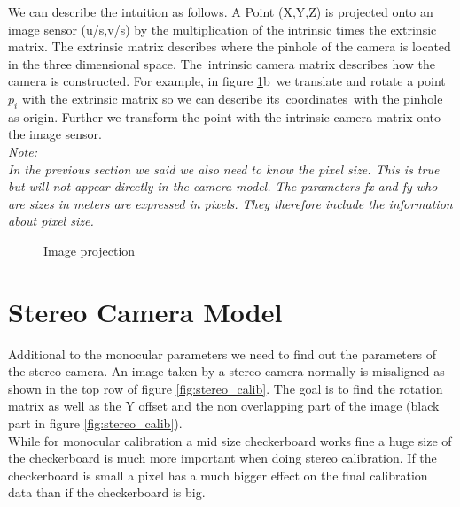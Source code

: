 \documentclass[11pt,a4paper,titlepage,oneside]{report}
\begin{document}
We can describe the intuition as follows. A Point (X,Y,Z) is projected onto an image sensor (u/s,v/s) by the multiplication of the intrinsic times the extrinsic matrix. The extrinsic matrix describes where the pinhole of the camera is located in the three dimensional space. The intrinsic camera matrix describes how the camera is constructed. For example, in figure \ref{fig:projection}b we translate and rotate a point $p_i$ with the extrinsic matrix so we can describe its coordinates with the pinhole as origin. Further we transform the point with the intrinsic camera matrix onto the image sensor.\\
\em
Note:\\
In the previous section we said we also need to know the pixel size. This is true but will not appear directly in the camera model. The parameters fx and fy who are sizes in meters are expressed in pixels. They therefore include the information about pixel size.
\normalfont

\begin{figure}[H]
	\centering
	\caption{Image projection}\label{fig:projection}
\end{figure}

\section{Stereo Camera Model}

Additional to the monocular parameters we need to find out the parameters of the stereo camera. An image taken by a stereo camera normally is misaligned as shown in the top row of figure \ref{fig:stereo_calib}. The goal is to find the rotation matrix as well as the Y offset and the non overlapping part of the image (black part in figure \ref{fig:stereo_calib}).\\
While for monocular calibration a mid size checkerboard works fine a huge size of the checkerboard is much more important when doing stereo calibration. If the checkerboard is small a pixel has a much bigger effect on the final calibration data than if the checkerboard is big.
\end{document}
